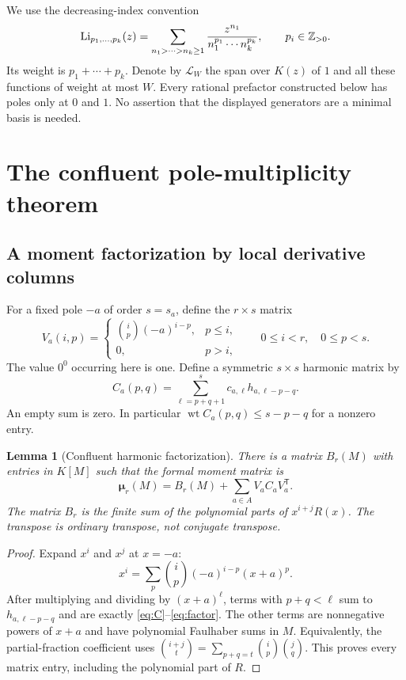 \documentclass[11pt,letterpaper]{article}
\numberwithin{equation}{section}
\newtheorem{lemma}[theorem]{Lemma}
\theoremstyle{definition}\newtheorem{definition}[theorem]{Definition}
\theoremstyle{remark}\newtheorem{remark}[theorem]{Remark}
\newcommand{\wt}{\operatorname{wt}}\newcommand{\Res}{\operatorname{Res}}
\begin{document}
We use the decreasing-index convention
\begin{equation}\label{eq:mpl}
 \operatorname{Li}_{p_1,\ldots,p_k}(z)=
 \sum_{n_1>\cdots>n_k\ge1}
       \frac{z^{n_1}}{n_1^{p_1}\cdots n_k^{p_k}},
 \qquad p_i\in\mathbb Z_{>0}.
\end{equation}
Its weight is $p_1+\cdots+p_k$. Denote by $\mathscr L_W$ the span over
$K(z)$ of $1$ and all these functions of weight at most $W$. Every
rational prefactor constructed below has poles only at $0$ and $1$.
No assertion that the displayed generators are a minimal basis is needed.

\section{The confluent pole-multiplicity theorem}

\subsection{A moment factorization by local derivative columns}

For a fixed pole $-a$ of order $s=s_a$, define the $r\times s$ matrix
\begin{equation}\label{eq:V}
 V_a(i,p)=\begin{cases}\binom ip(-a)^{i-p},&p\le i,\\0,&p>i,
                    \end{cases}
 \qquad 0\le i<r,\quad0\le p<s.
\end{equation}
The value $0^0$ occurring here is one. Define a symmetric $s\times s$
harmonic matrix by
\begin{equation}\label{eq:C}
 C_a(p,q)=\sum_{\ell=p+q+1}^{s}
                   c_{a,\ell}h_{a,\ell-p-q}.
\end{equation}
An empty sum is zero. In particular
$\wt C_a(p,q)\le s-p-q$ for a nonzero entry.

\begin{lemma}[Confluent harmonic factorization]\label{thm:factor}
There is a matrix $B_r(M)$ with entries in $K[M]$ such that the formal
moment matrix is
\begin{equation}\label{eq:factor}
       \boldsymbol\mu_r(M)=B_r(M)+\sum_{a\in A}V_a C_a V_a^{\mathsf T}.
\end{equation}
The matrix $B_r$ is the finite sum of the polynomial parts of
$x^{i+j}R(x)$. The transpose is ordinary transpose, not conjugate
transpose.
\end{lemma}
\begin{proof}
Expand $x^i$ and $x^j$ at $x=-a$:
\[
 x^i=\sum_p\binom ip(-a)^{i-p}(x+a)^p.
\]
After multiplying and dividing by $(x+a)^\ell$, terms with $p+q<\ell$
sum to $h_{a,\ell-p-q}$ and are exactly \eqref{eq:C}--\eqref{eq:factor}.
The other terms are nonnegative powers of $x+a$ and have polynomial
Faulhaber sums in $M$. Equivalently, the partial-fraction coefficient
uses
$\binom{i+j}{t}=\sum_{p+q=t}\binom ip\binom jq$.
This proves every matrix entry, including the polynomial part of $R$.
\end{proof}
\end{document}

